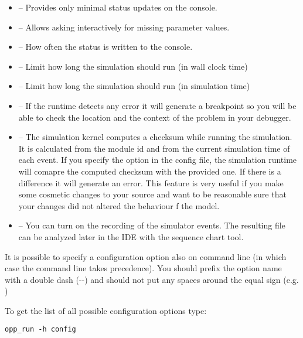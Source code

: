 \begin{itemize}
  \item {} -- Provides only minimal status updates on the console.
  \item {} -- Allows asking interactively for missing
        parameter values.
  \item {} -- How often the status is written to the console.
  \item {} -- Limit how long the simulation should run (in wall clock time)
  \item {} -- Limit how long the simulation should run (in simulation time)
  \item {} -- If the runtime detects any error it will generate a breakpoint
        so you will be able to check the location and the context of the problem in your debugger.
  \item {} -- The simulation kernel computes a checksum while running the simulation.
          It is calculated from the module id and from the current simulation time of each event.
          If you specify the  option in the config file, the simulation runtime will
          comapre the computed checksum with the provided one. If there is a difference it will
          generate an error. This feature is very useful if you make some cosmetic changes to your
          source and want to be reasonable sure that your changes did not altered the behaviour
          f the model.
  \item {} -- You can turn on the recording of the simulator events. The
           resulting file can be analyzed later in the IDE with the sequence chart tool.
\end{itemize}

\begin{note}
  It is possible to specify a configuration option also on command line (in which case the
  command line takes precedence). You should prefix the option name with a double
  dash (-{}-) and should not put any spaces around the equal sign
  (e.g. )
\end{note}

To get the list of all possible configuration options type:

\begin{verbatim}
opp_run -h config
\end{verbatim}


